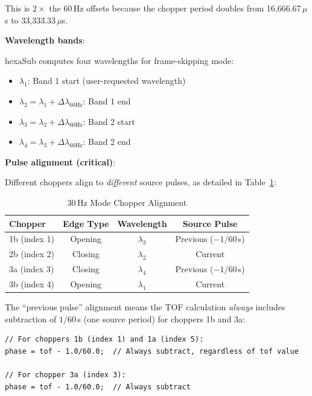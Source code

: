 \documentclass[tm]{ornltm}
\begin{document}
This is $2 \times$ the 60\,Hz offsets because the chopper period doubles from 16,666.67\,$\mu$s to 33,333.33\,$\mu$s.

\textbf{Wavelength bands}:

hexaSub computes four wavelengths for frame-skipping mode:
\begin{itemize}
    \item $\lambda_1$: Band 1 start (user-requested wavelength)
    \item $\lambda_2 = \lambda_1 + \Delta\lambda_{60\text{Hz}}$: Band 1 end
    \item $\lambda_3 = \lambda_2 + \Delta\lambda_{60\text{Hz}}$: Band 2 start  
    \item $\lambda_4 = \lambda_3 + \Delta\lambda_{60\text{Hz}}$: Band 2 end
\end{itemize}

\textbf{Pulse alignment (critical)}:

Different choppers align to \emph{different} source pulses, as detailed in Table~\ref{tab:30hz_alignment}:

\begin{table}[ht]
\centering

\caption{30\,Hz Mode Chopper Alignment}
\label{tab:30hz_alignment}
\begin{tabular}{lccc}
\toprule
Chopper & Edge Type & Wavelength & Source Pulse \\
\midrule
1b (index 1) & Opening & $\lambda_3$ & Previous ($-1/60$\,s) \\
2b (index 2) & Closing & $\lambda_2$ & Current \\
3a (index 3) & Closing & $\lambda_4$ & Previous ($-1/60$\,s) \\
3b (index 4) & Opening & $\lambda_1$ & Current \\
\bottomrule
\end{tabular}

\end{table}

The ``previous pulse'' alignment means the TOF calculation \emph{always} includes subtraction of $1/60$\,s (one source period) for choppers 1b and 3a:

\begin{verbatim}
// For choppers 1b (index 1) and 1a (index 5):
phase = tof - 1.0/60.0;  // Always subtract, regardless of tof value

// For chopper 3a (index 3):
phase = tof - 1.0/60.0;  // Always subtract
\end{verbatim}
\end{document}
